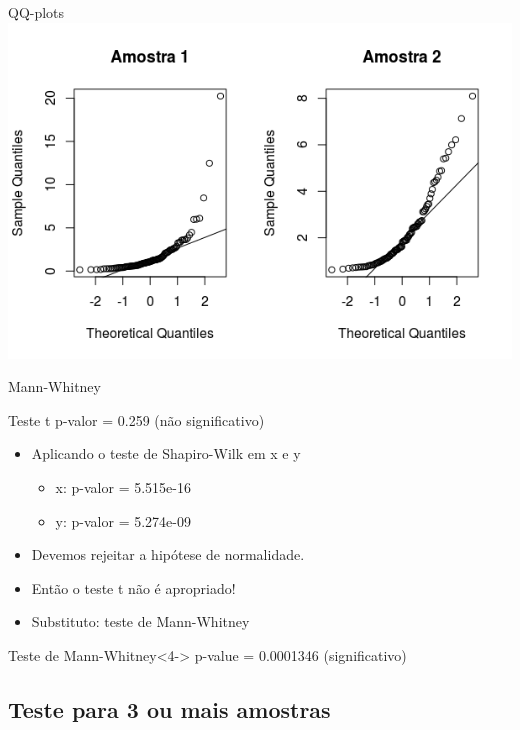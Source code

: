 \documentclass{beamer}
\begin{document}
\begin{frame}{QQ-plots}
 \includegraphics[width=\textwidth]{Cap37-38/2samples-qq}

\end{frame}

\begin{frame}{Mann-Whitney}
  \begin{exampleblock}{Teste t}
    \small
    p-valor = 0.259 (não significativo)
  \end{exampleblock}
  \begin{itemize}
    \small
  \item<2-> Aplicando o teste de Shapiro-Wilk em x e y
    \begin{itemize}
      \scriptsize
    \item<2-> x: p-valor = 5.515e-16
    \item<2-> y: p-valor = 5.274e-09
    \end{itemize}
    \bigskip
  \item<3-> Devemos rejeitar a hipótese de normalidade.
  \item<3-> Então o teste t \alert{não é} apropriado!
  \item<3-> Substituto: teste de Mann-Whitney
  \end{itemize}
  \begin{exampleblock}{Teste de Mann-Whitney}<4->
    \small
    p-value = \alert{0.0001346} (significativo)
  \end{exampleblock}
\end{frame}

\subsection[3+ amostras]{Teste para 3 ou mais amostras}
\end{document}

